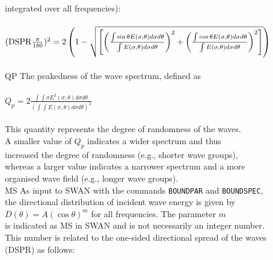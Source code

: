 \documentclass[12pt]{book}
\begin{document}
\begin{tabbing}
                        integrated over all frequencies):\\
                        \\
$({\rm DSPR} \frac{\pi}{180})^2 = 2\left( 1 - \sqrt{\left[ \left( \frac{\int\sin\theta E(\sigma,\theta)d\sigma d\theta}{\int E(\sigma,\theta)d\sigma d\theta} \right)^2 + \left( \frac{\int \cos\theta E(\sigma,\theta)d\sigma d\theta}{\int E(\sigma,\theta)d\sigma d\theta} \right)^2 \right]}\right)$ \\
                        \-\\
QP                   \> The peakedness of the wave spectrum, defined as\+\\
                        \\
$Q_p = 2 \frac{\int \int \sigma E^2(\sigma, \theta) d\sigma d\theta}{(\int \int E(\sigma, \theta) d\sigma d\theta)^2}$ \\
                        \\
                        This quantity represents the degree of randomness of the waves.\\
                        A smaller value of $Q_p$ indicates a wider spectrum and thus\\
                        increased the degree of randomness (e.g., shorter wave groups),\\
                        whereas a larger value indicates a narrower spectrum and a more\\
                        organised wave field (e.g., longer wave groups).\-\\
MS                   \> As input to SWAN with the commands {\tt BOUNDPAR} and {\tt BOUNDSPEC},\+\\
                        the directional distribution
                        of incident wave energy is given by\\
                        $D(\theta) = A(\cos\theta)^m$
                        for all frequencies. The parameter $m$\\
                        is indicated as MS in SWAN and is not necessarily an integer number.\\
                        This number is related to the
                        one-sided directional spread of the waves\\
                        (DSPR) as follows:\-\\
\end{tabbing}
\newpage
\end{document}
